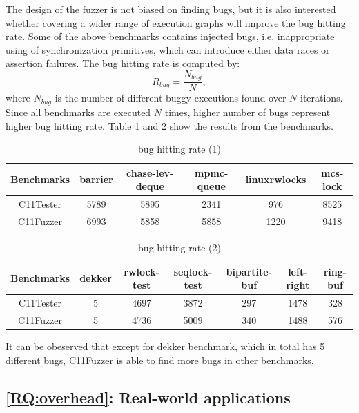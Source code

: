 The design of the fuzzer is not biased on finding bugs, but it is also interested whether covering a wider range of execution graphs will improve the bug hitting rate. Some of the above benchmarks contains injected bugs, i.e. inappropriate using of synchronization primitives, which can introduce either data races or assertion failures. The bug hitting rate is computed by:
\[
	R_{bug} = \frac{N_{bug}}{N},
\]
where $N_{bug}$ is the number of different buggy executions found over $N$ iterations. Since all benchmarks are executed $N$ times, higher number of bugs represent higher bug hitting rate. Table \ref{buggy1} and \ref{buggy2} show the results from the benchmarks.


\begin{table}[h!]
	\begin{tabular}{ |c|ccccc| }
		\hline
		Benchmarks  & barrier & chase-lev-deque & mpmc-queue & linuxrwlocks & mcs-lock \\
		\hline 
		C11Tester   & 5789    & 5895            & 2341       & 976          & 8525     \\
		C11Fuzzer   & 6993    & 5858            & 5858       & 1220         & 9418     \\
        \hline
	\end{tabular}
	\caption{bug hitting rate (1)}
	\label{buggy1}

\end{table}

\begin{table}[h!]
	\begin{tabular}{ |c|cccccc| }
		\hline
		Benchmarks  & dekker & rwlock-test & seqlock-test & bipartite-buf & left-right & ring-buf \\
		\hline 
		C11Tester   & 5    & 4697        & 3872         & 297           & 1478       & 328      \\
		C11Fuzzer   & 5    & 4736        & 5009         & 340           & 1488       & 576      \\
		\hline
	\end{tabular}
	\caption{bug hitting rate (2)}
	\label{buggy2}
\end{table}

It can be obeserved that except for dekker benchmark, which in total has 5 different bugs, C11Fuzzer is able to find more bugs in other benchmarks. 



\subsection{\ref*{RQ:overhead}: Real-world applications}




